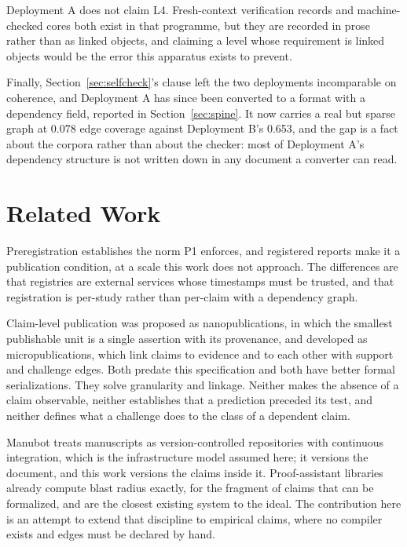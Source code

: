 \documentclass[journal]{IEEEtran}
\begin{document}
Deployment A does not claim L4. Fresh-context verification records and
machine-checked cores both exist in that programme, but they are recorded in
prose rather than as linked objects, and claiming a level whose requirement is
linked objects would be the error this apparatus exists to prevent.

Finally, Section~\ref{sec:selfcheck}'s clause left the two deployments incomparable on
coherence, and Deployment A has since been converted to a format with a
dependency field, reported in Section~\ref{sec:spine}. It now carries a real but
sparse graph at 0.078 edge coverage against Deployment B's 0.653, and the gap is
a fact about the corpora rather than about the checker: most of Deployment A's
dependency structure is not written down in any document a converter can read.

\section{Related Work}
\label{sec:related}

Preregistration establishes the norm P1 enforces, and registered reports make it
a publication condition, at a scale this work does not approach. The differences
are that registries are external services whose timestamps must be trusted, and
that registration is per-study rather than per-claim with a dependency graph.

Claim-level publication was proposed as nanopublications, in which the smallest
publishable unit is a single assertion with its provenance, and developed as
micropublications, which link claims to evidence and to each other with support
and challenge edges. Both predate this specification and both have better formal
serializations. They solve granularity and linkage. Neither makes the absence of
a claim observable, neither establishes that a prediction preceded its test, and
neither defines what a challenge does to the class of a dependent claim.

Manubot treats manuscripts as version-controlled repositories with continuous
integration, which is the infrastructure model assumed here; it versions the
document, and this work versions the claims inside it. Proof-assistant libraries
already compute blast radius exactly, for the fragment of claims that can be
formalized, and are the closest existing system to the ideal. The contribution
here is an attempt to extend that discipline to empirical claims, where no
compiler exists and edges must be declared by hand.
\end{document}
